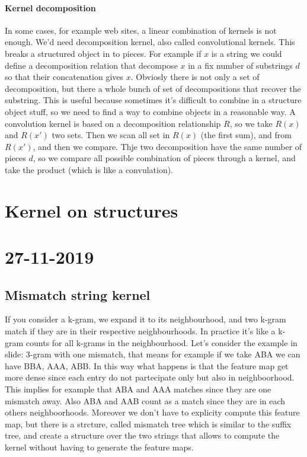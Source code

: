 \subsubsection{Kernel decomposition}
In some cases, for example web sites, a linear combination of kernels is not enough. We'd need decomposition kernel, also called convolutional kernels. This breaks a structured object in to pieces.\newline
For example if $x$ is a string we could define a decomposition relation that decompose $x$ in a fix number of substrings $d$ so that their concatenation gives $x$. Obviosly there is not only a set of decomposition, but there a whole bunch of set of decompositions that recover the substring.\newline
This is useful because sometimes it's difficult to combine in a structure object stuff, so we need to find a way to combine objects in a reasonable way.\newline
A convolution kernel is based on a decomposition relationship $R$, so we take $R(x)$ and $R(x')$ two sets. Then we scan all set in $R(x)$ (the first sum), and from $R(x')$, and then we compare. Thje two decomposition have the same number of pieces $d$, so we compare all possible combination of pieces through a kernel, and take the product (which is like a convulation). 
\chapter{Kernel on structures}
\chapter{27-11-2019}
\section{Mismatch string kernel}
If you consider a k-gram, we expand it to its neighbourhood, and two k-gram match if they are in their respective neighbourhoods. In practice it's like a k-gram counts for all k-grams in the neighbourhood.\newline
Let's consider the example in slide: 3-gram with one mismatch, that means for example if we take ABA we can have BBA, AAA, ABB. In this way what happens is that the feature map get more dense since each entry do not partecipate only but also in neighboorhood. This implies for example that ABA and AAA matches since they are one mismatch away. Also ABA and AAB count as a match since they are in each others neighboorhoods. Moreover we don't have to explicity compute this feature map, but there is a strcture, called mismatch tree which is similar to the suffix tree, and create a structure over the two strings that allows to compute the kernel without having to generate the feature maps. 

